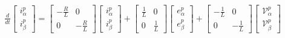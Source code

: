 \begin{equation}
    \begin{split}
        \frac{d}{dt}
        \begin{bmatrix}
            i^{p}_{\alpha} \\
            i^{p}_{\beta}
        \end{bmatrix}
        =
        \begin{bmatrix}
            -\frac{R}{L} & 0            \\
            0            & -\frac{R}{L}
        \end{bmatrix}
        \begin{bmatrix}
            i^{p}_{\alpha} \\
            i^{p}_{\beta}
        \end{bmatrix}
        +
        \begin{bmatrix}
            \frac{1}{L} & 0           \\
            0           & \frac{1}{L}
        \end{bmatrix}
        \begin{bmatrix}
            e^{p}_{\alpha} \\
            e^{p}_{\beta}
        \end{bmatrix}
        +
        \begin{bmatrix}
            -\frac{1}{L} & 0            \\
            0            & -\frac{1}{L}
        \end{bmatrix}
        \begin{bmatrix}
            \mathcal{V}^{p}_{\alpha} \\
            \mathcal{V}^{p}_{\beta}
        \end{bmatrix}
    \end{split}
    \label{eq:state_space_alpha_beta_positive}
\end{equation}
